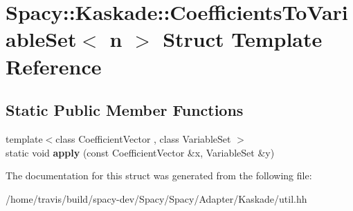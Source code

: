 \hypertarget{structSpacy_1_1Kaskade_1_1CoefficientsToVariableSet}{\section{Spacy\-:\-:Kaskade\-:\-:Coefficients\-To\-Variable\-Set$<$ n $>$ Struct Template Reference}
\label{structSpacy_1_1Kaskade_1_1CoefficientsToVariableSet}
}
\subsection*{Static Public Member Functions}
\begin{DoxyCompactItemize}
\item 
\hypertarget{structSpacy_1_1Kaskade_1_1CoefficientsToVariableSet_ae781a8e6bdd675c290d92b32c8f365a2}{{\footnotesize template$<$class Coefficient\-Vector , class Variable\-Set $>$ }\\static void {\bfseries apply} (const Coefficient\-Vector \&x, Variable\-Set \&y)}\label{structSpacy_1_1Kaskade_1_1CoefficientsToVariableSet_ae781a8e6bdd675c290d92b32c8f365a2}

\end{DoxyCompactItemize}


The documentation for this struct was generated from the following file\-:\begin{DoxyCompactItemize}
\item 
/home/travis/build/spacy-\/dev/\-Spacy/\-Spacy/\-Adapter/\-Kaskade/util.\-hh\end{DoxyCompactItemize}
